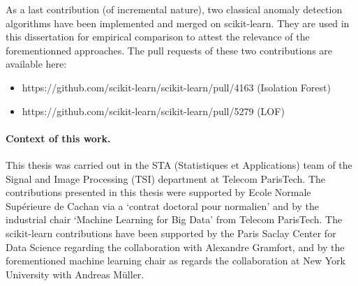 As a last contribution (of incremental nature), two classical anomaly detection algorithms have been implemented and merged on scikit-learn. They are used in this dissertation for empirical comparison to attest the relevance of the forementionned approaches.
The pull requests of these two contributions are available here:
\begin{itemize}
\item https://github.com/scikit-learn/scikit-learn/pull/4163  (Isolation Forest)
\item https://github.com/scikit-learn/scikit-learn/pull/5279 (LOF)
\end{itemize}


\paragraph{Context of this work.}
This thesis was carried out in the STA (Statistiques et Applications) team of the Signal and Image Processing (TSI) department at Telecom ParisTech. The contributions presented in this thesis were supported by Ecole Normale Supérieure de Cachan via a `contrat doctoral pour normalien' and by the industrial chair `Machine Learning for Big Data' from Telecom ParisTech. The scikit-learn contributions have been supported by the Paris Saclay Center for Data Science regarding the collaboration with Alexandre Gramfort, and by the forementioned machine learning chair as regards the collaboration at New York University with Andreas Müller.

